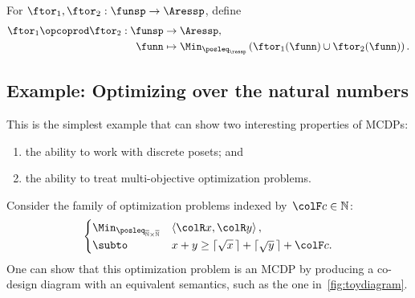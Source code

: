 \begin{definition}
\label{def:opcoprod}For $\ftor_{1},\ftor_{2}:\funsp\rightarrow\Aressp$,
define
\begin{align*}
\ftor_{1}\opcoprod\ftor_{2}:\funsp & \rightarrow\Aressp,\\
\funn& \mapsto\Min_{\posleq_{\ressp}}\left(\ftor_{1}(\funn)\cup\ftor_{2}(\funn)\right).
\end{align*}
\end{definition}


\subsection{Example: Optimizing over the natural numbers}

This is the simplest example that can show two interesting properties
of MCDPs:
\begin{enumerate}
\item the ability to work with discrete posets; and
\item the ability to treat multi-objective optimization problems.
\end{enumerate}
Consider the family of optimization problems indexed by~${\colF c}\in\mathbb{N}$:
\begin{equation}
\begin{cases}
\Min_{\posleq_{\overline{\mathbb{N}}\times\overline{\mathbb{N}}}} & \left\langle {\colR x},{\colR y}\right\rangle ,\\
\subto & x+y\geq\lceil\sqrt{x}\,\rceil+\lceil\sqrt{y}\,\rceil+{\colF c}.
\end{cases}\label{eq:example-1}
\end{equation}
One can show that this optimization problem is an MCDP by producing
a co-design diagram with an equivalent semantics, such as the one
in~\cref{fig:toydiagram}.

